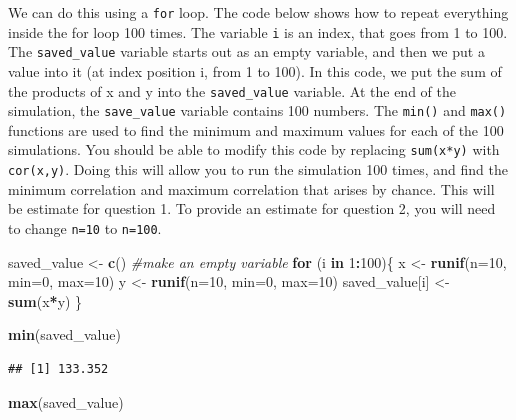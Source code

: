\documentclass[
]{book}
\newenvironment{Shaded}{\begin{snugshade}}{\end{snugshade}}
\newcommand{\AttributeTok}[1]{\textcolor[rgb]{0.13,0.29,0.53}{#1}}
\newcommand{\CommentTok}[1]{\textcolor[rgb]{0.56,0.35,0.01}{\textit{#1}}}
\newcommand{\ControlFlowTok}[1]{\textcolor[rgb]{0.13,0.29,0.53}{\textbf{#1}}}
\newcommand{\DecValTok}[1]{\textcolor[rgb]{0.00,0.00,0.81}{#1}}
\newcommand{\FunctionTok}[1]{\textcolor[rgb]{0.13,0.29,0.53}{\textbf{#1}}}
\newcommand{\NormalTok}[1]{#1}
\newcommand{\OtherTok}[1]{\textcolor[rgb]{0.56,0.35,0.01}{#1}}
\newcommand{\SpecialCharTok}[1]{\textcolor[rgb]{0.81,0.36,0.00}{\textbf{#1}}}
\begin{document}
We can do this using a \texttt{for} loop. The code below shows how to repeat everything inside the for loop 100 times. The variable \texttt{i} is an index, that goes from 1 to 100. The \texttt{saved\_value} variable starts out as an empty variable, and then we put a value into it (at index position i, from 1 to 100). In this code, we put the sum of the products of x and y into the \texttt{saved\_value} variable. At the end of the simulation, the \texttt{save\_value} variable contains 100 numbers. The \texttt{min()} and \texttt{max()} functions are used to find the minimum and maximum values for each of the 100 simulations. You should be able to modify this code by replacing \texttt{sum(x*y)} with \texttt{cor(x,y)}. Doing this will allow you to run the simulation 100 times, and find the minimum correlation and maximum correlation that arises by chance. This will be estimate for question 1. To provide an estimate for question 2, you will need to change \texttt{n=10} to \texttt{n=100}.

\begin{Shaded}
\begin{Highlighting}[]
\NormalTok{saved\_value }\OtherTok{\textless{}{-}} \FunctionTok{c}\NormalTok{() }\CommentTok{\#make an empty variable}
\ControlFlowTok{for}\NormalTok{ (i }\ControlFlowTok{in} \DecValTok{1}\SpecialCharTok{:}\DecValTok{100}\NormalTok{)\{}
\NormalTok{  x }\OtherTok{\textless{}{-}} \FunctionTok{runif}\NormalTok{(}\AttributeTok{n=}\DecValTok{10}\NormalTok{, }\AttributeTok{min=}\DecValTok{0}\NormalTok{, }\AttributeTok{max=}\DecValTok{10}\NormalTok{)}
\NormalTok{  y }\OtherTok{\textless{}{-}} \FunctionTok{runif}\NormalTok{(}\AttributeTok{n=}\DecValTok{10}\NormalTok{, }\AttributeTok{min=}\DecValTok{0}\NormalTok{, }\AttributeTok{max=}\DecValTok{10}\NormalTok{)}
\NormalTok{  saved\_value[i] }\OtherTok{\textless{}{-}} \FunctionTok{sum}\NormalTok{(x}\SpecialCharTok{*}\NormalTok{y)}
\NormalTok{\}}

\FunctionTok{min}\NormalTok{(saved\_value)}
\end{Highlighting}
\end{Shaded}

\begin{verbatim}
## [1] 133.352
\end{verbatim}

\begin{Shaded}
\begin{Highlighting}[]
\FunctionTok{max}\NormalTok{(saved\_value)}
\end{Highlighting}
\end{Shaded}
\end{document}
